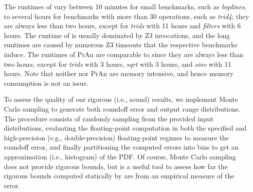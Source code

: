 %

%
%
%
The runtimes of \Tool vary between 10 minutes for small benchmarks, such as
\emph{bsplines}, to several hours for benchmarks with more than 30 operations,
such as \emph{trid4}; they are always less than two hours, except for
\emph{trids} with 11 hours and \emph{filters} with 6 hours.
%
The runtime of \Tool is usually dominated by Z3 invocations, and the long
runtimes are caused by numerous Z3 timeouts that the respective benchmarks
induce.
%
The runtimes of PrAn are comparable to \Tool since they are always less than
two hours, except for \emph{trids} with 3 hours, \emph{sqrt} with 3 hours, and
\emph{sine} with 11 hours.
%
Note that neither \Tool nor PrAn are memory intensive, and hence memory
consumption is not an issue.



To assess the quality of our rigorous (i.e., sound) results, we implement
Monte Carlo sampling to generate both roundoff error and output range
distributions.
%
The procedure consists of randomly sampling from the provided input
distributions, evaluating the floating-point computation in both the specified
and high-precision (e.g., double-precision) floating-point regimes to measure
the roundoff error, and finally partitioning the computed errors into bins to
get an approximation (i.e., histogram) of the PDF.
%
Of course, Monte Carlo sampling does not provide rigorous bounds, but is a
useful tool to assess how far the rigorous bounds computed statically by \Tool
are from an empirical measure of the error.


